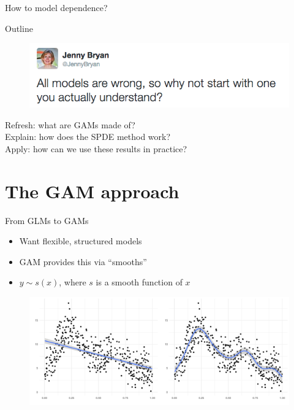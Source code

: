 \documentclass{beamer}
\begin{document}
\begin{frame}{How to model dependence?}
\begin{figure}[h]
\begin{center}
    \end{center}
  \end{figure}

\end{frame}

\begin{frame}{Outline}

  \begin{figure}[t]
    \begin{center}
      \includegraphics[width=\textwidth]{figures/jenny_models.png}
    \end{center}
  \end{figure}

{\Large
Refresh: what are GAMs made of? \\
Explain: how does the SPDE method work?\\
Apply: how can we use these results in practice?
}

\end{frame}

\section{The GAM approach}

\begin{frame}{From GLMs to GAMs}
  \begin{itemize}
    \item Want flexible, structured models
    \item GAM provides this via ``smooths''
    \item $y \sim s(x)$, where $s$ is a smooth function of $x$
  \end{itemize}
  \begin{figure}[h]
    \begin{center}
      \includegraphics[width=\textwidth]{figures/lmorsmooth.pdf}
    \end{center}
  \end{figure}
\end{frame}
\end{document}
